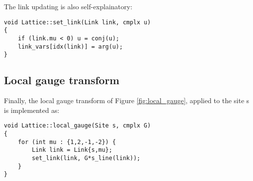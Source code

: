 The link updating is also self-explainatory:
\begin{lstlisting}[caption={Link updating}]
void Lattice::set_link(Link link, cmplx u)
{
    if (link.mu < 0) u = conj(u);
    link_vars[idx(link)] = arg(u);
}
\end{lstlisting}

\subsection*{Local gauge transform}

Finally, the local gauge transform of Figure \ref{fig:local_gauge},
applied to the site {\ttfamily s} is implemented as:
\begin{lstlisting}[caption={Local gauge transform}]
void Lattice::local_gauge(Site s, cmplx G)
{
    for (int mu : {1,2,-1,-2}) {
        Link link = Link{s,mu};
        set_link(link, G*s_line(link));
    }
}
\end{lstlisting}

